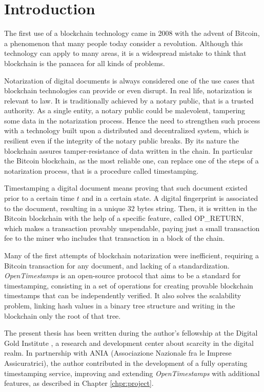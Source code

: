 \chapter{Introduction}
\label{chpr:intro}
The first use of a blockchain technology came in 2008 with the advent of Bitcoin, a phenomenon that many people today consider a revolution. Although this technology can apply to many areas, it is a widespread mistake to think that blockchain is the panacea for all kinds of problems.

\bigskip
\noindent
Notarization of digital documents is always considered one of the use cases that blockchain technologies can provide or even disrupt. In real life, notarization is relevant to law. It is traditionally achieved by a notary public, that is a trusted authority. As a single entity, a notary public could be malevolent, tampering some data in the notarization process.
Hence the need to strengthen such process with a technology built upon a distributed and decentralized system, which is resilient even if the integrity of the notary public breaks. By its nature the blockchain assures tamper-resistance of data written in the chain. In particular the Bitcoin blockchain, as the most reliable one, can replace one of the steps of a notarization process, that is a procedure called timestamping.

\bigskip
\noindent
Timestamping a digital document means proving that such document existed prior to a certain time $t$ and in a certain state. A digital fingerprint is associated to the document, resulting in a unique 32 bytes string. Then, it is written in the Bitcoin blockchain with the help of a specific feature, called OP\_RETURN, which makes a transaction provably unspendable, paying just a small transaction fee to the miner who includes that transaction in a block of the chain.

\bigskip
\noindent
Many of the first attempts of blockchain notarization were inefficient, requiring a Bitcoin transaction for any document, and lacking of a standardization. \textit{OpenTimestamps} is an open-source protocol that aims to be a standard for timestamping, consisting in a set of operations for creating provable blockchain timestamps that can be independently verified. It also solves the scalability problem, linking hash values in a binary tree structure and writing in the blockchain only the root of that tree.

\bigskip
\noindent
The present thesis has been written during the author's fellowship at the Digital Gold Institute \cite{DGI}, a research and development center about scarcity in the digital realm. In partnership with ANIA (Associazione Nazionale fra le Imprese Assicuratrici), the author contributed in the development of a fully operating timestamping service, improving and extending \textit{OpenTimestamps} with additional features, as described in Chapter \ref{chpr:project}.

